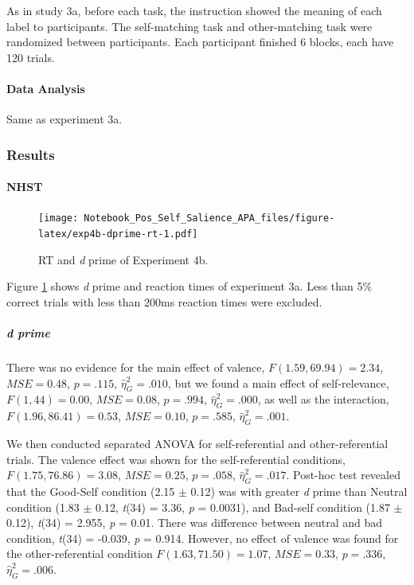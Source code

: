 \documentclass[
  english,
  man]{apa6}
\let\oldparagraph\paragraph
\renewcommand{\paragraph}[1]{\oldparagraph{#1}\mbox{}}
\let\oldsubparagraph\subparagraph
\renewcommand{\subparagraph}[1]{\oldsubparagraph{#1}\mbox{}}
\begin{document}
As in study 3a, before each task, the instruction showed the meaning of each label to participants. The self-matching task and other-matching task were randomized between participants. Each participant finished 6 blocks, each have 120 trials.

\hypertarget{data-analysis-10}{%
\paragraph{Data Analysis}\label{data-analysis-10}}

Same as experiment 3a.

\hypertarget{results-8}{%
\subsubsection{Results}\label{results-8}}

\hypertarget{nhst-7}{%
\paragraph{NHST}\label{nhst-7}}

\begin{figure}
\centering
\texttt{[image: Notebook\_Pos\_Self\_Salience\_APA\_files/figure-latex/exp4b-dprime-rt-1.pdf]}
\caption{\label{fig:exp4b-dprime-rt}RT and \emph{d} prime of Experiment 4b.}
\end{figure}

Figure \ref{fig:exp4b-dprime-rt} shows \emph{d} prime and reaction times of experiment 3a. Less than 5\% correct trials with less than 200ms reaction times were excluded.

\hypertarget{d-prime-8}{%
\subparagraph{d prime}\label{d-prime-8}}

There was no evidence for the main effect of valence, \(F(1.59, 69.94) = 2.34\), \(\mathit{MSE} = 0.48\), \(p = .115\), \(\hat{\eta}^2_G = .010\), but we found a main effect of self-relevance, \(F(1, 44) = 0.00\), \(\mathit{MSE} = 0.08\), \(p = .994\), \(\hat{\eta}^2_G = .000\), as well as the interaction, \(F(1.96, 86.41) = 0.53\), \(\mathit{MSE} = 0.10\), \(p = .585\), \(\hat{\eta}^2_G = .001\).

We then conducted separated ANOVA for self-referential and other-referential trials. The valence effect was shown for the self-referential conditions, \(F(1.75, 76.86) = 3.08\), \(\mathit{MSE} = 0.25\), \(p = .058\), \(\hat{\eta}^2_G = .017\). Post-hoc test revealed that the Good-Self condition (2.15 \(\pm\) 0.12) was with greater \emph{d} prime than Neutral condition (1.83 \(\pm\) 0.12, \emph{t}(34) = 3.36, \emph{p} = 0.0031), and Bad-self condition (1.87 \(\pm\) 0.12), \emph{t}(34) = 2.955, \emph{p} = 0.01. There was difference between neutral and bad condition, \emph{t}(34) = -0.039, \emph{p} = 0.914. However, no effect of valence was found for the other-referential condition \(F(1.63, 71.50) = 1.07\), \(\mathit{MSE} = 0.33\), \(p = .336\), \(\hat{\eta}^2_G = .006\).
\end{document}
